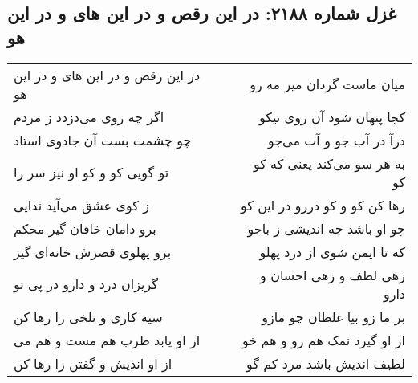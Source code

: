 \begin{center}
\section*{غزل شماره ۲۱۸۸: در این رقص و در این های و در این هو}
\label{sec:2188}
\begin{longtable}{l p{0.5cm} r}
در این رقص و در این های و در این هو
&&
میان ماست گردان میر مه رو
\\
اگر چه روی می‌دزدد ز مردم
&&
کجا پنهان شود آن روی نیکو
\\
چو چشمت بست آن جادوی استاد
&&
درآ در آب جو و آب می‌جو
\\
تو گویی کو و کو او نیز سر را
&&
به هر سو می‌کند یعنی که کو کو
\\
ز کوی عشق می‌آید ندایی
&&
رها کن کو و کو دررو در این کو
\\
برو دامان خاقان گیر محکم
&&
چو او باشد چه اندیشی ز باجو
\\
برو پهلوی قصرش خانه‌ای گیر
&&
که تا ایمن شوی از درد پهلو
\\
گریزان درد و دارو در پی تو
&&
زهی لطف و زهی احسان و دارو
\\
سیه کاری و تلخی را رها کن
&&
بر ما زو بیا غلطان چو مازو
\\
از او یابد طرب هم مست و هم می
&&
از او گیرد نمک هم رو و هم خو
\\
از او اندیش و گفتن را رها کن
&&
لطیف اندیش باشد مرد کم گو
\\
\end{longtable}
\end{center}
